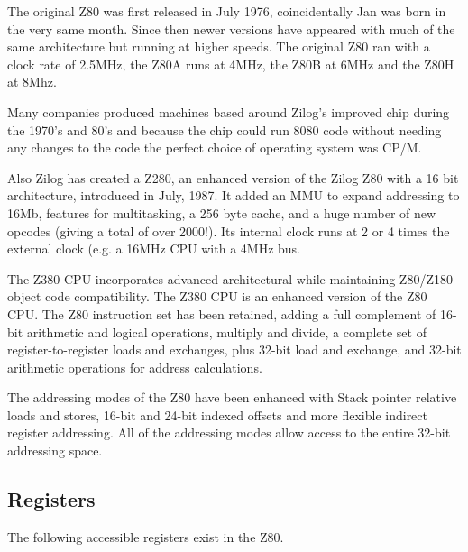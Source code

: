 The original Z80 was first released in July 1976, coincidentally Jan was born in the very same month. Since then newer versions have appeared with much of the same architecture but running at higher speeds. The original Z80 ran with a clock rate of 2.5MHz, the Z80A runs at 4MHz, the Z80B at 6MHz and the Z80H at 8Mhz. 

Many companies produced machines based around Zilog's improved chip during the 1970's and 80's and because the chip could run 8080 code without needing any changes to the code the perfect choice of operating system was CP/M. 

Also Zilog has created a Z280, an enhanced version of the Zilog Z80 with a 16 bit architecture, introduced in July, 1987. It added an MMU to expand addressing to 16Mb, features for multitasking, a 256 byte cache, and a huge number of new opcodes (giving a total of over 2000!). Its internal clock runs at 2 or 4 times the external clock (e.g. a 16MHz CPU with a 4MHz bus.

The Z380 CPU incorporates advanced architectural while maintaining Z80/Z180 object code compatibility. The Z380 CPU is an enhanced version of the Z80 CPU. The Z80 instruction set has been retained, adding a full complement of 16-bit arithmetic and logical operations, multiply and divide, a complete set of register-to-register loads and exchanges, plus 32-bit load and exchange, and 32-bit arithmetic operations for address calculations.

The addressing modes of the Z80 have been enhanced with Stack pointer relative loads and stores, 16-bit and 24-bit indexed offsets and more flexible indirect register addressing. All of the addressing modes allow access to the entire 32-bit addressing space.


\subsection{Registers}

The following accessible registers exist in the Z80.

\newcommand{\RegDesc}[2]{\rdelim\}{#1}{1ex}[#2]}

